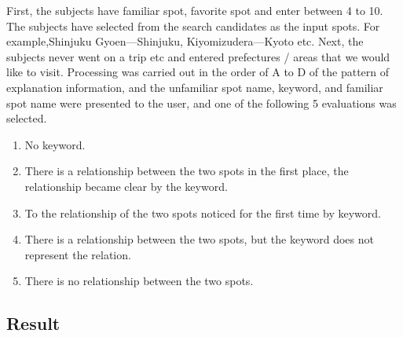 \documentclass[journal]{IAENGtran}
\begin{document}
First, the subjects have familiar spot, favorite spot and enter between 4 to 10.
The subjects have selected from the search candidates as the input spots.
For example,Shinjuku Gyoen---Shinjuku, Kiyomizudera---Kyoto etc.
Next, the subjects never went on a trip etc and entered prefectures / areas that we would like to visit.
Processing was carried out in the order of A to D of the pattern of explanation information, and the unfamiliar spot name, keyword, and familiar spot name were presented to the user, and one of the following 5 evaluations was selected.
\begin{enumerate}
  \item No keyword.
  \item There is a relationship between the two spots in the first place, the relationship became clear by the keyword.
  \item To the relationship of the two spots noticed for the first time by keyword.
  \item There is a relationship between the two spots, but the keyword does not represent the relation.
  \item There is no relationship between the two spots.
\end{enumerate}

\subsection{Result}
\label{subsec:Result}
\end{document}
